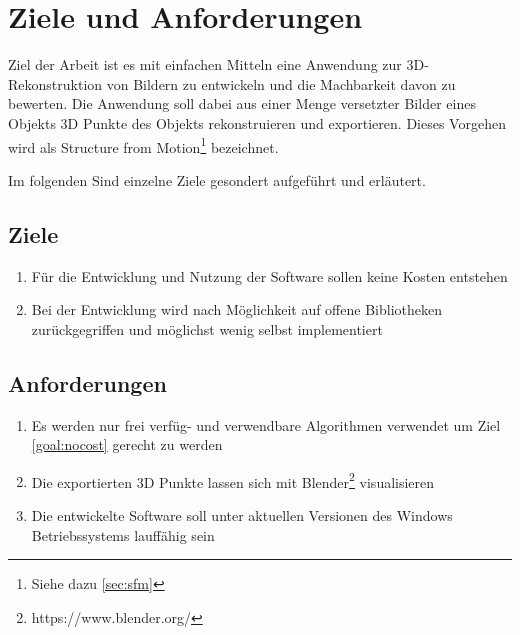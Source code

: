 
\chapter{Ziele und Anforderungen}
Ziel der Arbeit ist es mit einfachen Mitteln eine Anwendung zur 3D-Rekonstruktion von Bildern zu entwickeln und die Machbarkeit davon zu bewerten.
Die Anwendung soll dabei aus einer Menge versetzter Bilder eines Objekts 3D Punkte des Objekts rekonstruieren und exportieren.
Dieses Vorgehen wird als Structure from Motion\footnote{Siehe dazu \autoref{sec:sfm} } bezeichnet.

Im folgenden Sind einzelne Ziele gesondert aufgeführt und erläutert.

\section{Ziele}
\begin{enumerate}
\item \label{goal:nocost} Für die Entwicklung und Nutzung der Software sollen keine Kosten entstehen
\item Bei der Entwicklung wird nach Möglichkeit auf offene Bibliotheken zurückgegriffen und möglichst wenig selbst implementiert
\end{enumerate}


\section{Anforderungen}
\begin{enumerate}
\item Es werden nur frei verfüg- und verwendbare Algorithmen verwendet um Ziel \autoref{goal:nocost} gerecht zu werden
\item  Die exportierten 3D Punkte lassen sich mit Blender\footnote{https://www.blender.org/} visualisieren
\item Die entwickelte Software soll unter aktuellen Versionen des Windows Betriebssystems lauffähig sein
\end{enumerate}

